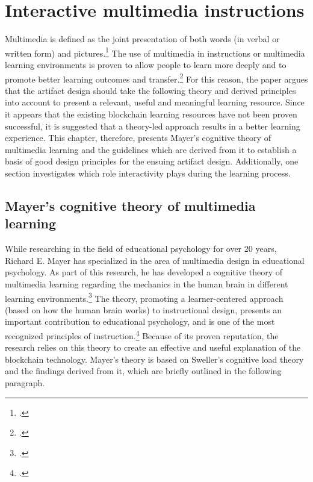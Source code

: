 \chapter{Interactive multimedia instructions} \label{chapter:Multimedia}

Multimedia is defined as the joint presentation of both words (in verbal or written form) and pictures.\footcites[Cf.][p.2]{MayerMultimediaLearning2009}[cf.][p.1205]{MarraffinoApplyingMultimediaLearning2016}[cf.][p.13]{MayerAnimationAidMultimedia2001} The use of multimedia in instructions or multimedia learning environments is proven to allow people to learn more deeply and to promote better learning outcomes and transfer.\footcites[Cf.][p.3]{MayerMultimediaLearning2009}[cf. in addition][]{MunzerLearningmultimediapresentations2009} For this reason, the paper argues that the artifact design should take the following theory and derived principles into account to present a relevant, useful and meaningful learning resource. Since it appears that the existing blockchain learning resources have not been proven successful, it is suggested that a theory-led approach results in a better learning experience. This chapter, therefore, presents Mayer's cognitive theory of multimedia learning and the guidelines which are derived from it to establish a basis of good design principles for the ensuing artifact design. Additionally, one section investigates which role interactivity plays during the learning process. 

\section{Mayer's cognitive theory of multimedia learning} \label{sec:MayersCTML}
While researching in the field of educational psychology for over 20 years, Richard E. Mayer has specialized in the area of multimedia design in educational psychology. As part of this research, he has developed a cognitive theory of multimedia learning regarding the mechanics in the human brain in different learning environments.\footcites[Cf.][]{MayerMultimediaLearning2009}
The theory, promoting a learner-centered approach (based on how the human brain works) to instructional design, presents an important contribution to educational psychology, and is one of the most recognized principles of instruction.\footcites[Cf.][chapter 1, paragraph 3]{ClarkElearningscienceinstruction2016}[cf.][p.4 et seqq]{MayerMultimediaLearning2009}[cf. in addition][]{SordenCognitiveTheoryMultimedia2012} Because of its proven reputation, the research relies on this theory to create an effective and useful explanation of the blockchain technology.
Mayer's theory is based on Sweller's cognitive load theory and the findings derived from it, which are briefly outlined in the following paragraph.


